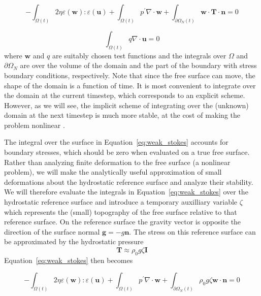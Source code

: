 \documentclass[preprint,12pt,authoryear]{elsarticle}
\begin{document}
\begin{equation}
-\int_{\Omega(t)} 2 \eta \varepsilon( \mathbf{w} ) \colon \varepsilon( \mathbf{u} ) + \int_{\Omega(t)} p^\prime \nabla \cdot \mathbf{w} 
+ \int_{\partial \Omega_N(t)} \mathbf{w} \cdot \mathbf{T} \cdot \mathbf{n} = 0 
\label{eq:weak_stokes}
\end{equation}

\begin{equation}
\int_{\Omega(t)} q \nabla \cdot \mathbf{u} = 0
\label{eq:weak_incompressible}
\end{equation}
where $\mathbf{w}$ and $q$ are suitably chosen test functions and the integrals over 
$\Omega$ and $\partial \Omega_N$ are over the volume of the domain and the part of the boundary with stress boundary conditions, respectively.
Note that since the free surface can move, the shape of the domain is a function of time.
It is most convenient to integrate over the domain at the current timestep, which corresponds to an explicit scheme.
However, as we will see, the implicit scheme of integrating over the (unknown) domain at the next timestep
is much more stable, at the cost of making the problem nonlinear \citep{furuichi2015implicit}.

The integral over the surface in Equation~\eqref{eq:weak_stokes} accounts for boundary stresses, 
which should be zero when evaluated on a true free surface.
Rather than analyzing finite deformation to the free surface (a nonlinear problem),
we will make the analytically useful approximation of small deformations about the hydrostatic 
reference surface and analyze their stability.
We will therefore  evaluate the integrals in Equation~\eqref{eq:weak_stokes} 
over the hydrostatic reference surface and introduce a temporary auxilliary variable $\zeta$ which 
represents the (small) topography of the free surface relative to that reference surface.
On the reference surface the gravity vector is opposite the direction of the surface normal $\mathbf{g} = -g \mathbf{n}$.
The stress on this reference surface can be approximated by the hydrostatic pressure
\begin{equation}
\mathbf{T} \approx \rho_0 g \zeta \mathbf{I}
\label{eq:hydrostatic}
\end{equation}
Equation~\eqref{eq:weak_stokes} then becomes

\begin{equation}
-\int_{\Omega(t)} 2 \eta \varepsilon( \mathbf{w} ) \colon \varepsilon( \mathbf{u} ) + \int_{\Omega(t)} p^\prime \nabla \cdot \mathbf{w} 
+ \int_{\partial \Omega_N(t)} \rho_0 g \zeta  \mathbf{w} \cdot \mathbf{n} = 0 
\end{equation}
\end{document}
